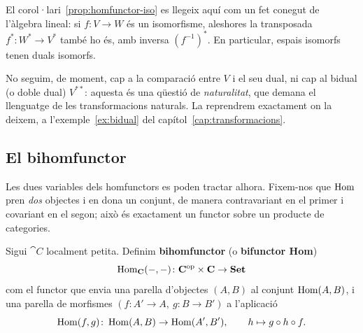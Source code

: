 \begin{exemple}
El corol·lari~\ref{prop:homfunctor-iso} es llegeix aquí com un fet conegut de l'àlgebra lineal: si $f\colon V\to W$ és un isomorfisme, aleshores la transposada $f^*\colon W^*\to V^*$ també ho és, amb inversa $(f^{-1})^*$. En particular, espais isomorfs tenen duals isomorfs.

No seguim, de moment, cap a la comparació entre $V$ i el seu dual, ni cap al bidual (o doble dual) $V^{**}$: aquesta és una qüestió de \emph{naturalitat}, que demana el llenguatge de les transformacions naturals. La reprendrem exactament on la deixem, a l'exemple~\ref{ex:bidual} del capítol~\ref{cap:transformacions}.
\end{exemple}


\subsection{El bihomfunctor}\label{subsec:bihomfunctor}

Les dues variables dels homfunctors es poden tractar alhora. Fixem-nos que $\operatorname{Hom}$ pren \emph{dos} objectes i en dona un conjunt, de manera contravariant en el primer i covariant en el segon; això és exactament un functor sobre un producte de categories.

\begin{definicio}[El bihomfunctor]\label{def:bihomfunctor}
Sigui $\cat{C}$ localment petita. Definim \textbf{bihomfunctor} (o \textbf{bifunctor Hom})
\[
\operatorname{Hom}_{\mathbf{C}}(-,-)\colon\mathbf{C}^{\mathrm{op}}\times\mathbf{C}\to\mathbf{Set}
\]
com el functor que envia una parella d'objectes $(A,B)$ al conjunt $\operatorname{Hom}(A,B)$, i una parella de morfismes $(f\colon A'\to A,\ g\colon B\to B')$ a l'aplicació
\[
\operatorname{Hom}(f,g)\colon\operatorname{Hom}(A,B)\to\operatorname{Hom}(A',B'),\qquad h\mapsto g\circ h\circ f.
\]
\end{definicio}

